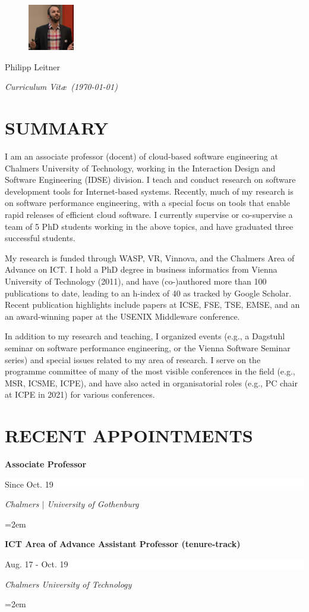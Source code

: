 \documentclass[paper=letter,fontsize=11pt]{scrartcl} %
\newcommand{\MyName}[1]{ %
		\Huge \usefont{OT1}{phv}{b}{n} \hfill #1
		\par \normalsize \normalfont}
\newcommand{\MySlogan}[1]{ %
		\large \usefont{OT1}{phv}{m}{n}\hfill \textit{#1}
		\par \normalsize \normalfont}
\newcommand{\NewPart}[2]{\section*{\uppercase{#1} #2}}
\newcommand{\EducationEntry}[4]{
		\noindent \textbf{#1} \hfill      %
		\colorbox{White}{%
			\parbox{10em}{%
			\hfill\color{Black}#2}} \par  %
		\noindent \textit{#3} \par        %
		\noindent\hangindent=2em\hangafter=0 \small #4 %
		\normalsize \par}
\begin{document}

\begin{figure}
	\vspace*{-2em}
		\includegraphics[width=0.18\textwidth]{profile.png}
\end{figure}

\MyName{Philipp Leitner}
\MySlogan{Curriculum Vit\ae\ (\today)}

\vspace{1cm}

\NewPart{Summary}{}
I am an associate professor (docent) of cloud-based software engineering at Chalmers University of Technology, working in the Interaction Design and Software Engineering (IDSE) division. I teach and conduct research on software development tools for Internet-based systems. Recently, much of my research is on software performance engineering, with a special focus on tools that enable rapid releases of efficient cloud software. I currently supervise or co-supervise a team of 5 PhD students working in the above topics, and have graduated three successful students.

My research is funded through WASP, VR, Vinnova, and the Chalmers Area of Advance on ICT. I hold a PhD degree in business informatics from Vienna University of Technology (2011), and have (co-)authored more than 100 publications to date, leading to an h-index of 40 as tracked by Google Scholar. Recent publication highlights include papers at ICSE, FSE, TSE, EMSE, and an an award-winning paper at the USENIX Middleware conference.

In addition to my research and teaching, I organized events (e.g., a Dagstuhl seminar on software performance engineering, or the Vienna Software Seminar series) and special issues related to my area of research. I serve on the programme committee of many of the most visible conferences in the field (e.g., MSR, ICSME, ICPE), and have also acted in organisatorial roles (e.g., PC chair at ICPE in 2021) for various conferences.


\NewPart{Recent Appointments}{}
\EducationEntry{Associate Professor}{Since Oct. 19}{Chalmers $|$ University of Gothenburg}{}
\EducationEntry{ICT Area of Advance Assistant Professor (tenure-track)}{Aug. 17 - Oct. 19}{Chalmers University of Technology}{}
\end{document}

